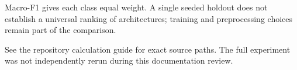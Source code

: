 \documentclass[11pt]{article}
\begin{document}
Macro-F1 gives each class equal weight. A single seeded holdout does not establish a universal ranking of architectures; training and preprocessing choices remain part of the comparison.

See the repository calculation guide for exact source paths. The full experiment was not independently rerun during this documentation review.
\end{document}
